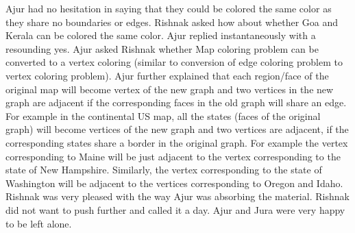 Ajur had no hesitation in saying that they could be colored the same color as they share no boundaries or edges. Rishnak asked how about whether Goa and Kerala can be colored the same color. Ajur replied instantaneously with a resounding yes. Ajur asked Rishnak whether Map coloring problem can be converted to a vertex coloring (similar to conversion of edge coloring problem to vertex coloring problem). Ajur further explained that each region/face of the original map will become vertex of the new graph and two vertices in the new graph are adjacent if the corresponding faces in the old graph will share an edge. For example in the continental US map, all the states (faces of the original graph) will become vertices of the new graph and two vertices are adjacent, if the corresponding states share a border in the original graph. For example the vertex corresponding to Maine will be just adjacent to the vertex corresponding to the state of New Hampshire. Similarly, the vertex corresponding to the state of Washington will be adjacent to the vertices corresponding to Oregon and Idaho. Rishnak was very pleased with the way Ajur was absorbing the material. Rishnak did not want to push further and called it a day. Ajur and Jura were very happy to be left alone. 
